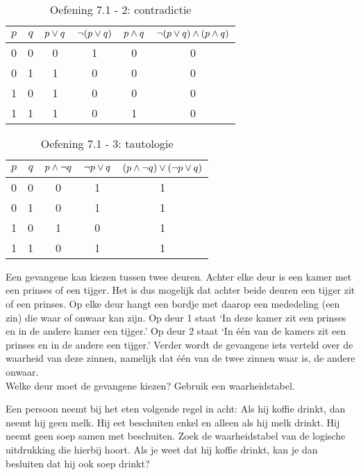 \begin{oef}
\begin{opl}
\begin{table}[htbp]\footnotesize
\centering
\caption{Oefening 7.1 - 2: contradictie}
\begin{tabular}{cccccc}
\toprule 
$p$ & $q$ & $p\vee q$ & $\neg(p\vee q)$ & $p\wedge q$ & $\neg(p\vee q)\wedge(p\wedge q)$ \\ 
\midrule 
0 & 0 & 0 & 1 & 0 & 0 \\ 
0 & 1 & 1 & 0 & 0 & 0 \\  
1 & 0 & 1 & 0 & 0 & 0 \\  
1 & 1 & 1 & 0 & 1 & 0 \\  
\bottomrule
\end{tabular} 
\label{tab:logica2}
\end{table}

\begin{table}[htbp]\footnotesize
\centering
\caption{Oefening 7.1 - 3: tautologie}
\begin{tabular}{ccccc}
\toprule
$p$ & $q$ & $p\wedge \neg q$ & $\neg p \vee q$ & $(p\wedge \neg q)\vee (\neg p \vee q)$ \\ 
\midrule
0 & 0 & 0 & 1 & 1 \\ 
0 & 1 & 0 & 1 & 1 \\ 
1 & 0 & 1 & 0 & 1 \\  
1 & 1 & 0 & 1 & 1 \\ 
\bottomrule
\end{tabular} 
\label{tab:logica3}
\end{table}
\end{opl}
\end{oef}



\begin{oef}
 Een gevangene kan kiezen tussen twee deuren. Achter elke deur
is een kamer met een prinses of een tijger. Het is dus mogelijk dat
achter beide deuren een tijger zit of een prinses.
Op elke deur hangt een bordje met daarop een mededeling (een
zin) die waar of onwaar kan zijn. Op deur 1 staat `In deze kamer zit
een prinses en in de andere kamer een tijger.' Op deur 2 staat `In één van de
kamers zit een prinses en in de andere een tijger.'
Verder wordt de gevangene iets verteld over de waarheid van
deze zinnen, namelijk dat één van de twee zinnen waar is, de
andere onwaar. \\
Welke deur moet de gevangene kiezen? Gebruik een waarheidstabel.
\end{oef}

\begin{oef}
 Een persoon neemt bij het eten volgende regel in acht:
Als hij koffie drinkt, dan neemt hij geen melk.
Hij eet beschuiten enkel en alleen als hij melk drinkt.
Hij neemt geen soep samen met beschuiten.
Zoek de waarheidstabel van de logische uitdrukking die hierbij hoort. 
Als je weet dat hij koffie drinkt, kan je dan besluiten dat hij ook soep drinkt?
\end{oef}

